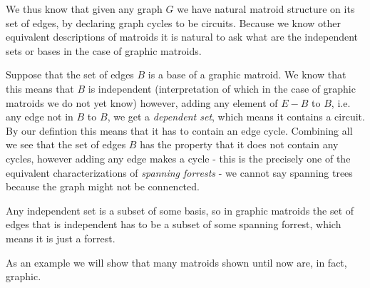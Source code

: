 We thus know that given any graph $G$ we have natural matroid structure on its set of edges, by declaring graph cycles to be circuits. Because we know other equivalent descriptions of matroids it is natural to ask what are the independent sets or bases in the case of graphic matroids. 

Suppose that the set of edges $B$ is a base of a graphic matroid. We know that this means that $B$ is independent (interpretation of which in the case of graphic matroids we do not yet know) however, adding any element of $E-B$ to $B$, i.e. any edge not in $B$ to $B$, we get a \textit{dependent set}, which means it contains a circuit. By our defintion this means that it has to contain an edge cycle. Combining all we see that the set of edges $B$ has the property that it does not contain any cycles, however adding any edge makes a cycle - this is the precisely one of the equivalent characterizations of \textit{spanning forrests} - we cannot say spanning trees because the graph might not be connencted. 

Any independent set is a subset of some basis, so in graphic matroids the set of edges that is independent has to be a subset of some spanning forrest, which means it is just a forrest.

As an example we will show that many matroids shown until now are, in fact, graphic. 


